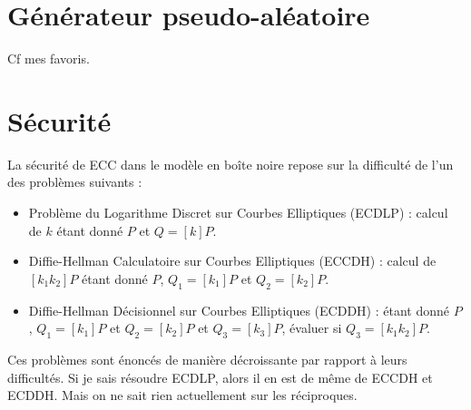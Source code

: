 \section{Générateur pseudo-aléatoire}
 Cf mes favoris.

\section{Sécurité}
La sécurité de ECC dans le modèle en boîte noire repose sur la difficulté de l'un des problèmes suivants :
\begin{itemize}[label=$\bullet$]
    \item Problème du Logarithme Discret sur Courbes Elliptiques (ECDLP) : calcul de $k$ étant donné $P$ et $Q = [k]P$.
    \item Diffie-Hellman Calculatoire sur Courbes Elliptiques (ECCDH) : calcul de $[k_1k_2]P$ étant donné $P$, $Q_1 = [k_1]P$ et $Q_2 = [k_2]P$.
    \item Diffie-Hellman Décisionnel sur Courbes Elliptiques (ECDDH) : étant donné $P$, $Q_1 = [k_1]P$ et $Q_2 = [k_2]P$ et $Q_3 = [k_3]P$, évaluer si $Q_3 = [k_1k_2]P$.
\end{itemize}

Ces problèmes sont énoncés de manière décroissante par rapport à leurs difficultés. Si je sais résoudre ECDLP, alors il en est de même de ECCDH et ECDDH. Mais on ne sait rien actuellement sur les réciproques.